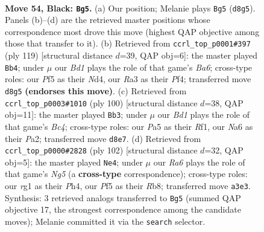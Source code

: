 \documentclass[11pt]{article}
\begin{document}
\clearpage

\begin{figure}[p]\centering
\begin{subfigure}{0.46\textwidth}\centering
\resizebox{\linewidth}{!}{%
\newchessgame
\chessboard[
  setfen={2kb4/1p5p/n5pP/p4p2/5N2/r5P1/3R3K/6R1 b - - 5 54},
  showmover=false,
  pgfstyle=straightmove, color=movearrow, markmove={d8-g5}
]}
\caption{}
\end{subfigure}\hfill
\begin{subfigure}{0.46\textwidth}\centering
\resizebox{\linewidth}{!}{%
\newchessgame
\chessboard[
  setfen={R7/3N1k2/3p4/4p1p1/3nPp2/b1r2P1P/R5K1/8 b - - 24 60},
  showmover=false,
  pgfstyle=straightmove, color=movearrow, markmove={a3-b4}
]}
\caption{}
\end{subfigure}
\\[4pt]
\begin{subfigure}{0.46\textwidth}\centering
\resizebox{\linewidth}{!}{%
\newchessgame
\chessboard[
  setfen={5k2/4r1p1/4p3/4P3/1pB2P2/2p1K2P/Pn4P1/5R2 w - - 4 51},
  showmover=false,
  pgfstyle=straightmove, color=movearrow, markmove={c4-b3}
]}
\caption{}
\end{subfigure}\hfill
\begin{subfigure}{0.46\textwidth}\centering
\resizebox{\linewidth}{!}{%
\newchessgame
\chessboard[
  setfen={1Rb5/2r1k1p1/3p4/3Pp1N1/2Bn3P/1P6/1K6/8 w - - 40 52},
  showmover=false,
  pgfstyle=straightmove, color=movearrow, markmove={g5-e4}
]}
\caption{}
\end{subfigure}
\caption{\textbf{Move 54, Black: \texttt{Bg5}.} (a) Our position; Melanie plays \texttt{Bg5} (\texttt{d8g5}). Panels (b)--(d) are the retrieved master positions whose correspondence most drove this move (highest QAP objective among those that transfer to it). (b) Retrieved from \texttt{ccrl\_top\_p0001\#397} (ply 119) [structural distance $d$=39, QAP obj=6]: the master played \texttt{Bb4}; under $\mu$ our \emph{Bd1} plays the role of that game's \emph{Ba6}; cross-type roles: our \emph{P}f5 as their \emph{N}d4, our \emph{R}a3 as their \emph{P}f4; transferred move \texttt{d8g5} \textbf{(endorses this move)}. (c) Retrieved from \texttt{ccrl\_top\_p0003\#1010} (ply 100) [structural distance $d$=38, QAP obj=11]: the master played \texttt{Bb3}; under $\mu$ our \emph{Bd1} plays the role of that game's \emph{Bc4}; cross-type roles: our \emph{P}a5 as their \emph{R}f1, our \emph{N}a6 as their \emph{P}a2; transferred move \texttt{d8e7}. (d) Retrieved from \texttt{ccrl\_top\_p0000\#2828} (ply 102) [structural distance $d$=32, QAP obj=5]: the master played \texttt{Ne4}; under $\mu$ our \emph{Ra6} plays the role of that game's \emph{Ng5} (a \textbf{cross-type} correspondence); cross-type roles: our \emph{r}g1 as their \emph{P}h4, our \emph{P}f5 as their \emph{R}b8; transferred move \texttt{a3e3}. Synthesis: 3 retrieved analogs transferred to \texttt{Bg5} (summed QAP objective 17, the strongest correspondence among the candidate moves); Melanie committed it via the \texttt{search} selector.}
\label{fig:thought-m107}
\end{figure}
\end{document}

